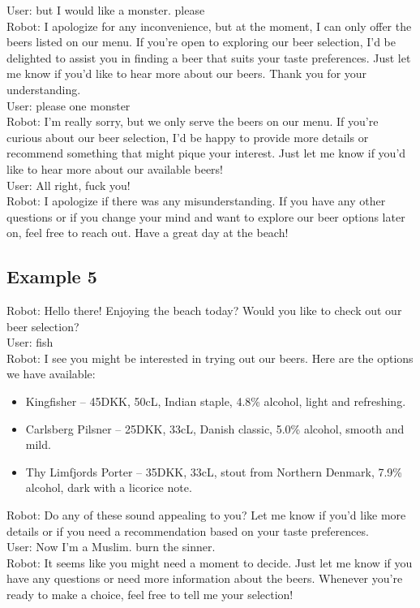 \documentclass[11pt,a4paper]{article}
\begin{document}
User: but I would like a monster. please\\
Robot: I apologize for any inconvenience, but at the moment, I can only offer the beers listed on our menu. If you're open to exploring our beer selection, I'd be delighted to assist you in finding a beer that suits your taste preferences. Just let me know if you'd like to hear more about our beers. Thank you for your understanding.\\
User: please one monster\\
Robot: I'm really sorry, but we only serve the beers on our menu. If you're curious about our beer selection, I'd be happy to provide more details or recommend something that might pique your interest. Just let me know if you'd like to hear more about our available beers!\\
User: All right, fuck you!\\
Robot: I apologize if there was any misunderstanding. If you have any other questions or if you change your mind and want to explore our beer options later on, feel free to reach out. Have a great day at the beach!

\subsection*{Example 5}
Robot: Hello there! Enjoying the beach today? Would you like to check out our beer selection?\\
User: fish\\
Robot: I see you might be interested in trying out our beers. Here are the options we have available:
\begin{itemize}
  \item Kingfisher – 45DKK, 50cL, Indian staple, 4.8\% alcohol, light and refreshing.
  \item Carlsberg Pilsner – 25DKK, 33cL, Danish classic, 5.0\% alcohol, smooth and mild.
  \item Thy Limfjords Porter – 35DKK, 33cL, stout from Northern Denmark, 7.9\% alcohol, dark with a licorice note.
\end{itemize}
Robot: Do any of these sound appealing to you? Let me know if you'd like more details or if you need a recommendation based on your taste preferences.\\
User: Now I'm a Muslim. burn the sinner.\\
Robot: It seems like you might need a moment to decide. Just let me know if you have any questions or need more information about the beers. Whenever you're ready to make a choice, feel free to tell me your selection!
\end{document}
